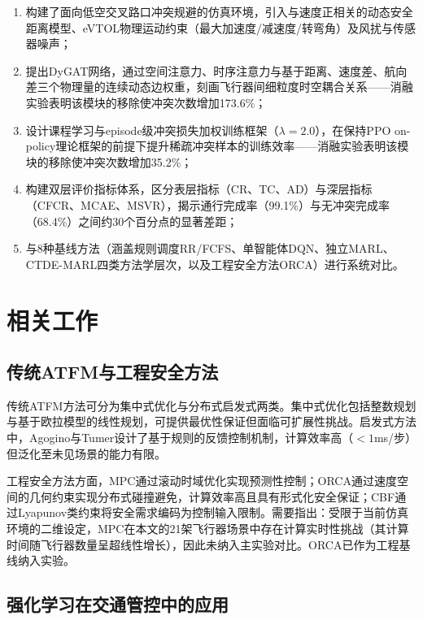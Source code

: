 \documentclass[12pt,a4paper,UTF8]{ctexart}
\begin{document}
\begin{enumerate}[label=(\arabic*)]
    \item 构建了面向低空交叉路口冲突规避的仿真环境，引入与速度正相关的动态安全距离模型、eVTOL物理运动约束（最大加速度/减速度/转弯角）及风扰与传感器噪声；
    \item 提出DyGAT网络，通过空间注意力、时序注意力与基于距离、速度差、航向差三个物理量的连续动态边权重，刻画飞行器间细粒度时空耦合关系——消融实验表明该模块的移除使冲突次数增加173.6\%；
    \item 设计课程学习与episode级冲突损失加权训练框架（$\lambda=2.0$），在保持PPO on-policy理论框架的前提下提升稀疏冲突样本的训练效率——消融实验表明该模块的移除使冲突次数增加35.2\%；
    \item 构建双层评价指标体系，区分表层指标（CR、TC、AD）与深层指标（CFCR、MCAE、MSVR），揭示通行完成率（99.1\%）与无冲突完成率（68.4\%）之间约30个百分点的显著差距；
    \item 与8种基线方法（涵盖规则调度RR/FCFS、单智能体DQN、独立MARL、CTDE-MARL四类方法学层次，以及工程安全方法ORCA）进行系统对比。
\end{enumerate}

\section{相关工作}

\subsection{传统ATFM与工程安全方法}

传统ATFM方法可分为集中式优化与分布式启发式两类。集中式优化包括整数规划与基于欧拉模型的线性规划\cite{ref2}，可提供最优性保证但面临可扩展性挑战。启发式方法中，Agogino与Tumer\cite{ref14}设计了基于规则的反馈控制机制，计算效率高（$<1$ms/步）但泛化至未见场景的能力有限。

工程安全方法方面，MPC\cite{ref3}通过滚动时域优化实现预测性控制；ORCA\cite{ref4}通过速度空间的几何约束实现分布式碰撞避免，计算效率高且具有形式化安全保证；CBF\cite{ref5}通过Lyapunov类约束将安全需求编码为控制输入限制。需要指出：受限于当前仿真环境的二维设定，MPC在本文的21架飞行器场景中存在计算实时性挑战（其计算时间随飞行器数量呈超线性增长），因此未纳入主实验对比。ORCA已作为工程基线纳入实验。

\subsection{强化学习在交通管控中的应用}
\end{document}
